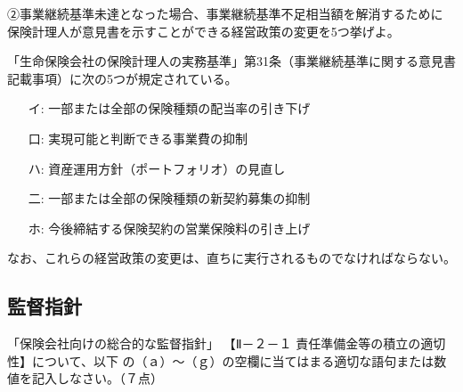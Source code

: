 \documentclass[report,gutter=10mm,fore-edge=10mm,uplatex,dvipdfmx]{jlreq}
\begin{document}
②事業継続基準未達となった場合、事業継続基準不足相当額を解消するために
保険計理人が意見書を示すことができる経営政策の変更を5つ挙げよ。

「生命保険会社の保険計理人の実務基準」第31条（事業継続基準に関する意見書記載事項）に次の5つが規定されている。

\begin{itemize}
\item[ イ: ] 一部または全部の保険種類の配当率の引き下げ
\item[ 口: ] 実現可能と判断できる事業費の抑制
\item[ ハ: ] 資産運用方針（ポートフォリオ）の見直し
\item[ 二: ] 一部または全部の保険種類の新契約募集の抑制
\item[ ホ: ] 今後締結する保険契約の営業保険料の引き上げ
\end{itemize}

なお、これらの経営政策の変更は、直ちに実行されるものでなければならない。



\subsection{監督指針}

「保険会社向けの総合的な監督指針」
【Ⅱ－２－１ 責任準備金等の積立の適切性】について、以下
の（ａ）～（ｇ）の空欄に当てはまる適切な語句または数値を記入しなさい。（７点）
\end{document}
